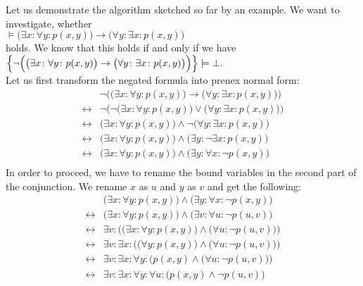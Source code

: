 Let us demonstrate the algorithm sketched so far by an example.
We want to investigate, whether \\[0.2cm]
\hspace*{1.3cm} 
$\models \big(\exists x\colon \forall y\colon  p(x,y)\big) \rightarrow \big(\forall
 y\colon \exists x\colon p(x,y)\big)$
 \\[0.2cm]
holds.  We know that this holds if and only if we have
 \\[0.2cm]
\hspace*{1.3cm} 
$\Big\{ \neg \Big(\big(\exists x\colon \forall y\colon  p(x,y)\big) \rightarrow
\big(\forall y\colon \exists x\colon p(x,y)\big)\Big)\Big\} \models \bot.$ 
\\[0.2cm]
Let us first transform the negated formula into prenex normal form: 
$$
\begin{array}{ll}
                  & \neg \Big(\big(\exists x\colon \forall y\colon  p(x,y)\big) \rightarrow \big(\forall y\colon \exists x\colon p(x,y)\big)\Big) \\
  \leftrightarrow & \neg \Big(\neg \big(\exists x\colon \forall y\colon  p(x,y)\big) \vee \big(\forall y\colon \exists x\colon p(x,y)\big)\Big) \\
  \leftrightarrow &                \big(\exists x\colon \forall y\colon  p(x,y)\big) \wedge \neg \big(\forall y\colon \exists x\colon p(x,y)\big) \\
  \leftrightarrow &\big(\exists x\colon \forall y\colon  p(x,y)\big) \wedge  \big(\exists y\colon  \neg \exists x\colon p(x,y)\big) \\
  \leftrightarrow &\big(\exists x\colon \forall y\colon  p(x,y)\big) \wedge  \big(\exists y\colon  \forall x\colon \neg p(x,y)\big) \\
\end{array}
$$
In order to proceed, we have to rename the bound variables in the second part of the
conjunction.   We rename  $x$ as $u$ and $y$ as $v$ and get the following:
$$
\begin{array}{ll}
                  &\big(\exists x\colon \forall y\colon  p(x,y)\big) \wedge  \big(\exists y\colon  \forall x\colon \neg p(x,y)\big) \\
  \leftrightarrow &\big(\exists x\colon \forall y\colon  p(x,y)\big) \wedge  \big(\exists v\colon  \forall u\colon \neg p(u,v)\big) \\
  \leftrightarrow &\exists v\colon  \Big( \big(\exists x\colon \forall y\colon  p(x,y)\big) \wedge  \big(\forall u\colon \neg p(u,v)\big) \Big)\\
  \leftrightarrow &\exists v\colon  \exists x\colon  \Big( \big(\forall y\colon  p(x,y)\big) \wedge \big(\forall u\colon \neg p(u,v)\big) \Big)\\
  \leftrightarrow &\exists v\colon  \exists x\colon \forall y\colon \Big( p(x,y) \wedge \big(\forall u\colon \neg p(u,v)\big) \Big)\\
  \leftrightarrow &\exists v\colon  \exists x\colon \forall y\colon \forall u\colon \Big( p(x,y) \wedge \neg p(u,v) \Big)\\
\end{array}
$$
